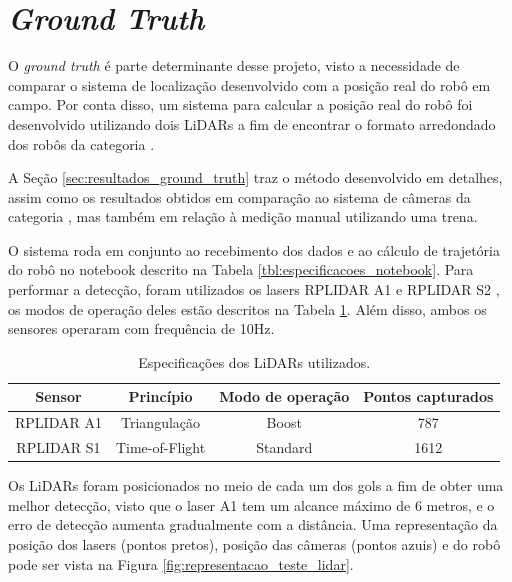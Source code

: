 \documentclass[acronym, symbols, table]{fei}
\begin{document}
	\section{\textit{Ground Truth}}\label{sec:metodologia_ground_truth}
	
	O \textit{ground truth} é parte determinante desse projeto, visto a necessidade de comparar o sistema de localização desenvolvido com a posição real do robô em campo. Por conta disso, um sistema para calcular a posição real do robô foi desenvolvido utilizando dois LiDARs a fim de encontrar o formato arredondado dos robôs da categoria .
	
	A Seção \ref{sec:resultados_ground_truth} traz o método desenvolvido em detalhes, assim como os resultados obtidos em comparação ao sistema de câmeras da categoria , mas também em relação à medição manual utilizando uma trena.
	
	O sistema roda em conjunto ao recebimento dos dados e ao cálculo de trajetória do robô no notebook descrito na Tabela \ref{tbl:especificacoes_notebook}. Para performar a detecção, foram utilizados os lasers RPLIDAR A1 \cite{rplidar_a1} e RPLIDAR S2 \cite{rplidar_s2}, os modos de operação deles estão descritos na Tabela \ref{tbl:especificacoes_laser}. Além disso, ambos os sensores operaram com frequência de 10Hz.
	
	\begin{table}[!htb]
		\centering
		\caption{Especificações dos LiDARs utilizados.}
		\label{tbl:especificacoes_laser}
		\begin{tabular}{|c|c|c|c|}
			\hline
			Sensor 				& Princípio 		& Modo de operação 	& Pontos capturados\\ \hline
			RPLIDAR A1			& Triangulação 		& Boost 			& 787 \\ \hline
			RPLIDAR S1 			& Time-of-Flight 	& Standard		    & 1612 \\ \hline
		\end{tabular}
	\end{table}

	Os LiDARs foram posicionados no meio de cada um dos gols a fim de obter uma melhor detecção, visto que o laser A1 tem um alcance máximo de 6 metros, e o erro de detecção aumenta gradualmente com a distância. Uma representação da posição dos lasers (pontos pretos), posição das câmeras (pontos azuis) e do robô pode ser vista na Figura \ref{fig:representacao_teste_lidar}.
	
\end{document}
